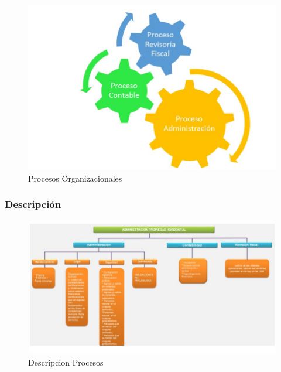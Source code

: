 \begin{figure}[th!]
	\centering
	\includegraphics[width=0.7\linewidth]{arquitectura/organizacion/imgs/procesos_org1}
	\caption{Procesos Organizacionales}	
\end{figure}

\newpage

\subsubsection{Descripción}


\begin{figure}[th!]
	\centering
	\includegraphics[width=0.7\linewidth]{arquitectura/organizacion/imgs/procesos_org2}
	\caption{Descripcion Procesos}
	
\end{figure}


